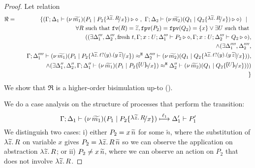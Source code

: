 \begin{proof}
	Let relation
%
	\begin{eqnarray*}
		\Re &=&
			\set{
				(\Gamma; \Delta_1 \proves \newsp{\widetilde{m_1}}{P_1 \Par P_2 \subst{\abs{\widetilde{z}}{R}}{x}} \hastype \Proc
				\ ,\ 
				\Gamma; \Delta_2 \proves \newsp{\widetilde{m_2}}{Q_1 \Par Q_2 \subst{\abs{\widetilde{z}}{R}}{x}} \hastype \Proc)
				\setbar
				\\
			&& \quad \forall R \textrm{ such that } \fv{R} = \widetilde{z}, \fpv{P_2} = \fpv{Q_2} = \set{x} \vee \exists U \text{ such that }
				\\
			&& \quad ((\exists \Delta_1''', \Delta_2''', \text{fresh } t, \Gamma; x: U; \Delta_1''' \proves P_2 \hastype \Proc, \Gamma; x: U; \Delta_2''' \proves Q_2 \hastype \Proc),
				\\
			&& \quad \land (\exists \Delta_1'''', \Delta_2'''', \\
			&& \quad \horel{\Gamma}{\Delta_1''''}{\newsp{\widetilde{m_1}}{P_1 \Par P_2 \subst{\auxtr{t}}{x}}}{\hwb}{\Delta_2''''}{\newsp{\widetilde{m_2}}{Q_1 \Par Q_2 \subst{\auxtr{t}}{x}}}),
				\\
			&& \quad \land (\exists \Delta_1'', \Delta_2'', \horel{\Gamma}{\Delta_1''}{\newsp{\widetilde{m_1}}{P_1 \Par P_2 \subst{\omapchar{U}}{x}}}{\hwb}{\Delta_2''}{\newsp{\widetilde{m_2}}{Q_1 \Par Q_2 \subst{\omapchar{U}}{x}}))} \\%
			&&}
	\end{eqnarray*}
%
	\noi  We show that $\Re$ is a higher-order bisimulation up-to \betatran ().

	\noi We do a case analysis on the structure of processes that perform the transition:
%
	\[
		\horel{\Gamma}{\Delta_1}{\newsp{\widetilde{m_1}}{P_1 \Par P_2\subst{\abs{\widetilde{z}}{R}}{x} }}{\hby{\ell_1}}{\Delta_1'}{P_1'}
	\]
%
	\noi We distinguish two cases:
	i) either $P_2 = x\, {\widetilde{n}}$ for some $\widetilde{n}$,
	where the substitution of $\lambda \widetilde{z}.\,R$
	on variable $x$ gives
	$P_2 = \lambda \widetilde{z}.\,R\, {\widetilde{n}}$ so we can observe the
	application on abstraction $\lambda \widetilde{z}.\,R$; or
	ii) $P_2 \not= x\, {\widetilde{n}}$, where we can observe
	an action on $P_2$ that does not involve $\lambda \widetilde{z}.\,R$.


\end{proof}
